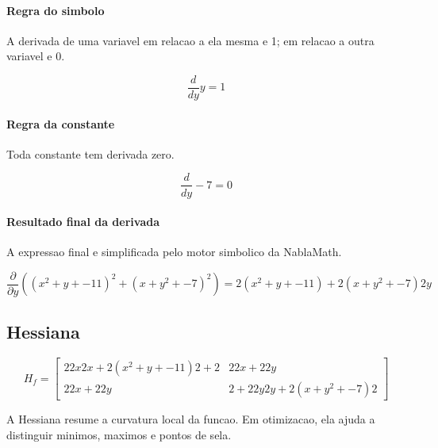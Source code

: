 \documentclass[11pt,a4paper]{article}
\begin{document}
\paragraph{Regra do simbolo} A derivada de uma variavel em relacao a ela mesma e 1; em relacao a outra variavel e 0.

\[
\frac{d}{dy}y=1
\]

\paragraph{Regra da constante} Toda constante tem derivada zero.

\[
\frac{d}{dy}-7=0
\]

\paragraph{Resultado final da derivada} A expressao final e simplificada pelo motor simbolico da NablaMath.

\[
\frac{\partial}{\partial y}\left(\left(x^{2} + y + -11\right)^{2} + \left(x + y^{2} + -7\right)^{2}\right)=2\left(x^{2} + y + -11\right) + 2\left(x + y^{2} + -7\right)2y
\]

\subsection{Hessiana}

\[
H_f=\begin{bmatrix}22x2x + 2\left(x^{2} + y + -11\right)2 + 2 & 22x + 22y\\22x + 22y & 2 + 22y2y + 2\left(x + y^{2} + -7\right)2\end{bmatrix}
\]

A Hessiana resume a curvatura local da funcao. Em otimizacao, ela ajuda a distinguir minimos, maximos e pontos de sela.
\end{document}
